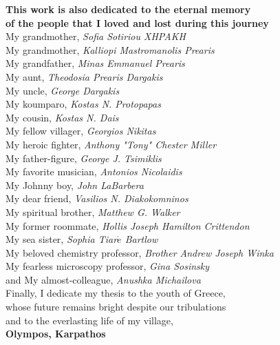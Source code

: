 \documentclass[12pt]{ucsddissertation}
\begin{document}
\begin{dedication}
\begin{center}
\vspace{0.3in}
\textbf{This work is also dedicated to the eternal memory \\of the people that I loved and lost during this journey} \\
\vspace{0.1in}
My grandmother, \textit{Sofia Sotiriou XHPAKH}\\
My grandmother, \textit{Kalliopi Mastromanolis Prearis}\\
My grandfather,  \textit{Minas Emmanuel Prearis}\\
My aunt, \textit{Theodosia Prearis Dargakis}\\
My uncle, \textit{George Dargakis}\\
My koumparo, \textit{Kostas N. Protopapas}\\
My cousin, \textit{Kostas N. Dais}\\
My fellow villager, \textit{Georgios Nikitas}\\
My heroic fighter, \textit{Anthony "Tony" Chester Miller}\\
My father-figure, \textit{George J. Tsimiklis}\\
My favorite musician, \textit{Antonios Nicolaidis}\\
My Johnny boy, \textit{John LaBarbera}\\
My dear friend, \textit{Vasilios N. Diakokomninos}\\
My spiritual brother, \textit{Matthew G. Walker}\\
My former roommate, \textit{Hollis Joseph Hamilton Crittendon}\\
My sea sister, \textit{Sophia Tiar$\acute{e}$ Bartlow}\\
My beloved chemistry professor, \textit{Brother Andrew Joseph Winka}\\
My fearless microscopy professor, \textit{Gina Sosinsky}\\
and My almost-colleague, \textit{Anushka Michailova}\\

\vspace{0.2in}
 Finally, I dedicate my thesis to the youth of Greece, \\whose future remains bright despite our tribulations\\ and to the everlasting life of my village,\\ \textbf{Olympos, Karpathos}
\end{center}

\end{dedication}
\end{document}
